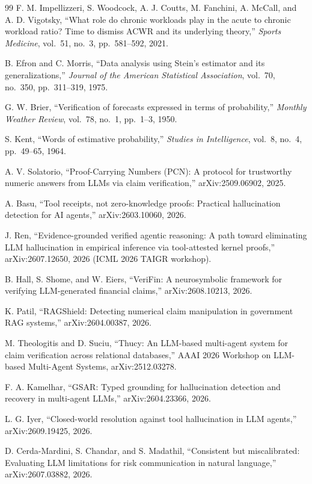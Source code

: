 \documentclass[11pt,a4paper]{article}
\begin{document}
\begin{thebibliography}{99}
F. M. Impellizzeri, S. Woodcock, A. J. Coutts, M. Fanchini, A. McCall, and
A. D. Vigotsky, ``What role do chronic workloads play in the acute to chronic
workload ratio? Time to dismiss ACWR and its underlying theory,''
\emph{Sports Medicine}, vol.~51, no.~3, pp.~581--592, 2021.

B. Efron and C. Morris, ``Data analysis using Stein's estimator and its
generalizations,'' \emph{Journal of the American Statistical Association},
vol.~70, no.~350, pp.~311--319, 1975.

G. W. Brier, ``Verification of forecasts expressed in terms of probability,''
\emph{Monthly Weather Review}, vol.~78, no.~1, pp.~1--3, 1950.

S. Kent, ``Words of estimative probability,'' \emph{Studies in Intelligence},
vol.~8, no.~4, pp.~49--65, 1964.

A. V. Solatorio, ``Proof-Carrying Numbers (PCN): A protocol for trustworthy
numeric answers from LLMs via claim verification,'' arXiv:2509.06902, 2025.

A. Basu, ``Tool receipts, not zero-knowledge proofs: Practical hallucination
detection for AI agents,'' arXiv:2603.10060, 2026.

J. Ren, ``Evidence-grounded verified agentic reasoning: A path toward eliminating
LLM hallucination in empirical inference via tool-attested kernel proofs,''
arXiv:2607.12650, 2026 (ICML 2026 TAIGR workshop).

B. Hall, S. Shome, and W. Eiers, ``VeriFin: A neurosymbolic framework for
verifying LLM-generated financial claims,'' arXiv:2608.10213, 2026.

K. Patil, ``RAGShield: Detecting numerical claim manipulation in government RAG
systems,'' arXiv:2604.00387, 2026.

M. Theologitis and D. Suciu, ``Thucy: An LLM-based multi-agent system for claim
verification across relational databases,'' AAAI 2026 Workshop on LLM-based
Multi-Agent Systems, arXiv:2512.03278.

F. A. Kamelhar, ``GSAR: Typed grounding for hallucination detection and recovery
in multi-agent LLMs,'' arXiv:2604.23366, 2026.

L. G. Iyer, ``Closed-world resolution against tool hallucination in LLM
agents,'' arXiv:2609.19425, 2026.

D. Cerda-Mardini, S. Chandar, and S. Madathil, ``Consistent but miscalibrated:
Evaluating LLM limitations for risk communication in natural language,''
arXiv:2607.03882, 2026.


\end{thebibliography}
\end{document}

